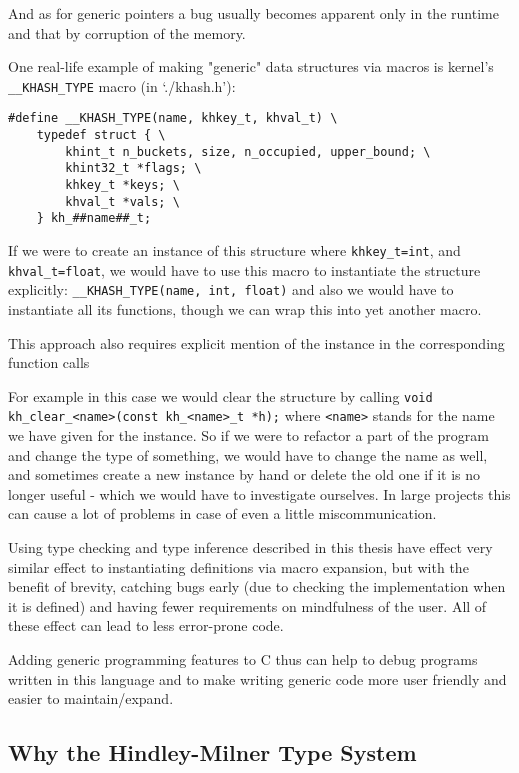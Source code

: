 And as for generic pointers a bug usually becomes apparent only in the runtime and that by corruption of the memory.

One real-life example of making "generic" data structures via macros is kernel's \lstinline{__KHASH_TYPE} macro (in `./khash.h'):

\begin{lstlisting}
#define __KHASH_TYPE(name, khkey_t, khval_t) \
	typedef struct { \
		khint_t n_buckets, size, n_occupied, upper_bound; \
		khint32_t *flags; \
		khkey_t *keys; \
		khval_t *vals; \
	} kh_##name##_t;
\end{lstlisting}

If we were to create an instance of this structure where \lstinline{khkey_t=int}, and \lstinline{khval_t=float},
we would have to use this macro to instantiate the structure explicitly:
\lstinline{__KHASH_TYPE(name, int, float)} and also we would have to instantiate all its functions, though we can wrap this into yet another macro.

This approach also requires explicit mention of the instance in the corresponding function calls

For example in this case we would clear the structure by calling
\lstinline{void kh_clear_<name>(const kh_<name>_t *h);} where \lstinline{<name>} stands for the name we have given for the instance. So if we were to refactor a part of the program and change the type of something, we would have to change the name as well, and sometimes create a new instance by hand or delete the old one if it is no longer useful - which we would have to investigate ourselves. In large projects this can cause a lot of problems in case of even a little miscommunication.

Using type checking and type inference described in this thesis have effect very similar effect to instantiating definitions via macro expansion, but with the benefit of brevity, catching bugs early (due to checking the implementation when it is defined) and having fewer requirements on mindfulness of the user. All of these effect can lead to less error-prone code.

Adding generic programming features to C thus can help to debug programs written in this language and to make writing generic code more user friendly and easier to maintain/expand. %

\subsection{Why the Hindley-Milner Type System}

